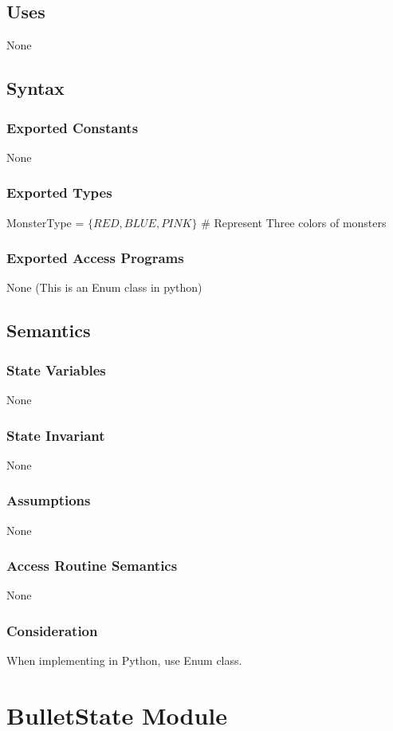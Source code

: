 \documentclass[12pt]{article}
\begin{document}
\subsection*{Uses}
None

\subsection*{Syntax}
\subsubsection*{Exported Constants}
None
\subsubsection*{Exported Types}
MonsterType = $\{RED, BLUE, PINK\}$ \# Represent Three colors of monsters
\subsubsection*{Exported Access Programs}
None (This is an Enum class in python)

\subsection*{Semantics}
\subsubsection*{State Variables}
None
\subsubsection*{State Invariant}
None
\subsubsection*{Assumptions}
None
\subsubsection*{Access Routine Semantics}
None
\subsubsection*{Consideration}
When implementing in Python, use Enum class.
\newpage

\section{BulletState Module}
\end{document}

